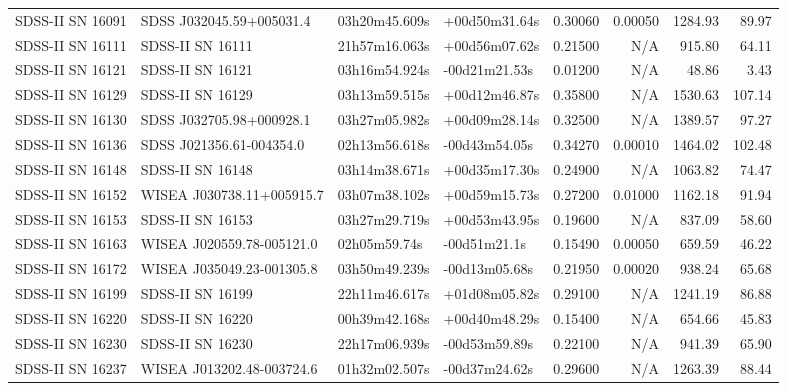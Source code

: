 \begin{longtable}{llllrrrr}
SDSS-II SN 16091 &        SDSS J032045.59+005031.4 &   03h20m45.609s &   +00d50m31.64s &  0.30060 &  0.00050 &  1284.93 &       89.97 \\
SDSS-II SN 16111 &                SDSS-II SN 16111 &   21h57m16.063s &   +00d56m07.62s &  0.21500 &      N/A &   915.80 &       64.11 \\
SDSS-II SN 16121 &                SDSS-II SN 16121 &   03h16m54.924s &   -00d21m21.53s &  0.01200 &      N/A &    48.86 &        3.43 \\
SDSS-II SN 16129 &                SDSS-II SN 16129 &   03h13m59.515s &   +00d12m46.87s &  0.35800 &      N/A &  1530.63 &      107.14 \\
SDSS-II SN 16130 &        SDSS J032705.98+000928.1 &   03h27m05.982s &   +00d09m28.14s &  0.32500 &      N/A &  1389.57 &       97.27 \\
SDSS-II SN 16136 &        SDSS J021356.61-004354.0 &   02h13m56.618s &   -00d43m54.05s &  0.34270 &  0.00010 &  1464.02 &      102.48 \\
SDSS-II SN 16148 &                SDSS-II SN 16148 &   03h14m38.671s &   +00d35m17.30s &  0.24900 &      N/A &  1063.82 &       74.47 \\
SDSS-II SN 16152 &       WISEA J030738.11+005915.7 &   03h07m38.102s &   +00d59m15.73s &  0.27200 &  0.01000 &  1162.18 &       91.94 \\
SDSS-II SN 16153 &                SDSS-II SN 16153 &   03h27m29.719s &   +00d53m43.95s &  0.19600 &      N/A &   837.09 &       58.60 \\
SDSS-II SN 16163 &       WISEA J020559.78-005121.0 &    02h05m59.74s &    -00d51m21.1s &  0.15490 &  0.00050 &   659.59 &       46.22 \\
SDSS-II SN 16172 &       WISEA J035049.23-001305.8 &   03h50m49.239s &   -00d13m05.68s &  0.21950 &  0.00020 &   938.24 &       65.68 \\
SDSS-II SN 16199 &                SDSS-II SN 16199 &   22h11m46.617s &   +01d08m05.82s &  0.29100 &      N/A &  1241.19 &       86.88 \\
SDSS-II SN 16220 &                SDSS-II SN 16220 &   00h39m42.168s &   +00d40m48.29s &  0.15400 &      N/A &   654.66 &       45.83 \\
SDSS-II SN 16230 &                SDSS-II SN 16230 &   22h17m06.939s &   -00d53m59.89s &  0.22100 &      N/A &   941.39 &       65.90 \\
SDSS-II SN 16237 &       WISEA J013202.48-003724.6 &   01h32m02.507s &   -00d37m24.62s &  0.29600 &      N/A &  1263.39 &       88.44 \\

\end{longtable}
